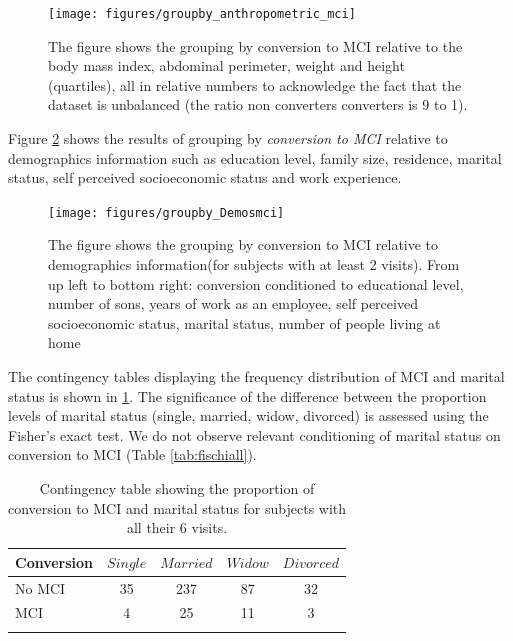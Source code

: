 \documentclass[11pt]{article}
\theoremstyle{definition}
\theoremstyle{remark}
\begin{document}
\begin{figure}[H]
        \centering
        \texttt{[image: figures/groupby\_anthropometric\_mci]}
        \caption{The figure shows the grouping by conversion to MCI relative to the body mass index, abdominal perimeter, weight and height (quartiles), all in relative numbers to acknowledge the fact that the dataset is unbalanced (the ratio non converters converters is 9 to 1).} 
        \label{fig:groupby_anthropometric_mci}
\end{figure}

Figure \ref{fig:groupby_Demosmci} shows the results of grouping by \emph{conversion to MCI} relative to demographics information such as education level, family size, residence, marital status, self perceived socioeconomic status and work experience. 

\begin{figure}[H]
        \centering
        \texttt{[image: figures/groupby\_Demosmci]}
        \caption{The figure shows the grouping by conversion to MCI relative to demographics information(for subjects with at least 2 visits). From up left to bottom right: conversion conditioned to educational level, number of sons, years of work as an employee, self perceived socioeconomic status, marital status, number of people living at home } 
        \label{fig:groupby_Demosmci}
\end{figure}

The contingency tables displaying the frequency distribution of MCI and marital status is shown in \ref{tab:maritmci}. The significance of the difference between the proportion levels of marital status (single, married, widow, divorced) is assessed using the Fisher's exact test.
We do not observe relevant conditioning of marital status on conversion to MCI (Table \ref{tab:fischiall}).

\begin{table}[ht]
  \centering
  \caption{Contingency table showing the proportion of conversion to MCI and marital status for subjects with all their 6 visits.}
  \begin{tabular}[t]{lcccc}
  \hline
  Conversion&{$Single$}&{$Married$}&{$Widow$}&{$Divorced$} \\
  \hline
  No MCI&35&237&87&32\\  
  MCI&4&25&11&3\\
  \hline
  \label{tab:maritmci}
  \end{tabular}
\end{table}%
\end{document}
